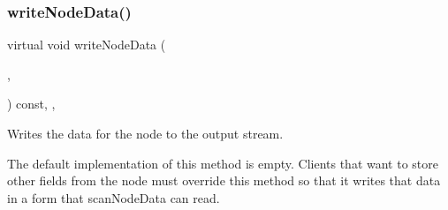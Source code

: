 \subsubsection{\texorpdfstring{write\+Node\+Data()}{writeNodeData()}}
{\footnotesize\ttfamily virtual void write\+Node\+Data (\begin{DoxyParamCaption}\item[{std\+::ostream \&}]{,  }\item[{\mbox{\hyperlink{classVertexGen}{Vertex\+Gen}}$<$ V, E $>$  $\ast$}]{ }\end{DoxyParamCaption}) const\hspace{0.3cm}{\ttfamily [inline]}, {\ttfamily [virtual]}, {\ttfamily [inherited]}}



Writes the data for the node to the output stream. 

The default implementation of this method is empty. Clients that want to store other fields from the node must override this method so that it writes that data in a form that scan\+Node\+Data can read. 